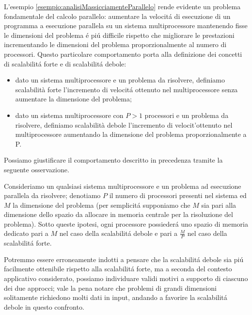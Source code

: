 L'esempio \ref{esempio:analisiMassicciamenteParallelo} rende evidente un problema fondamentale del calcolo parallelo: aumentare la velocit\'a di esecuzione 
di un programma a esecuzione parallela su un sistema multiprocessore mantenendo fisse le dimensioni del problema \'e pi\'u difficile rispetto che migliorare 
le prestazioni incrementando le dimensioni del problema proporzionalmente al numero di processori.\newline
Questo particolare comportamento porta alla definizione dei concetti di scalabilit\'a forte e di scalabilit\'a debole:
\begin{itemize}
    \item dato un sistema multiprocessore e un problema da risolvere, definiamo scalabilità forte l'incremento di velocit\'a ottenuto nel multiprocessore 
    senza aumentare la dimensione del problema;
    \item dato un sistema multiprocessore con $P > 1$ processori e un problema da risolvere, definiamo scalabilità debole l'incremento di velocit'\a ottenuto 
    nel multiprocessore aumentando la dimensione del problema proporzionalmente a P.
\end{itemize}
Possiamo giustificare il comportamento descritto in precedenza tramite la seguente osservazione.

Consideriamo un qualsiasi sistema multiprocessore e un problema ad esecuzione parallela da risolvere; denotiamo $P$ il numero di processori presenti nel 
sistema ed $M$ la dimensione del problema (per semplicit\'a supponiamo che $M$ sia pari alla dimensione dello spazio da allocare in memoria centrale per la 
risoluzione del problema).\newline
Sotto queste ipotesi, ogni processore possieder\'a uno spazio di memoria dedicato pari a $M$ nel caso della scalabilit\'a debole e pari a $\frac{M}{P}$ nel 
caso della scalabilit\'a forte.

Potremmo essere erroneamente indotti a pensare che la scalabilit\'a debole sia pi\'u facilmente ottenibile rispetto alla scalabilit\'a forte, ma a seconda 
del contesto applicativo considerato, possiamo individuare validi motivi a supporto di ciascuno dei due approcci; vale la pena notare che problemi di grandi 
dimensioni solitamente richiedono molti dati in input, andando a favorire la scalabilit\'a debole in questo confronto.